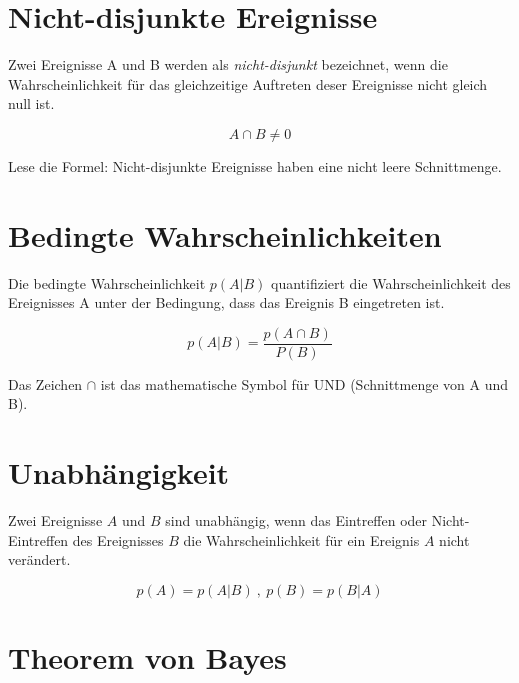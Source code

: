 \documentclass[
]{book}
\begin{document}
\hypertarget{nicht-disjunkte-ereignisse}{%
\section{Nicht-disjunkte Ereignisse}\label{nicht-disjunkte-ereignisse}}

Zwei Ereignisse A und B werden als \emph{nicht-disjunkt} bezeichnet, wenn die Wahrscheinlichkeit für das gleichzeitige Auftreten deser Ereignisse nicht gleich null ist.

\begin{equation}
  A \cap B \neq 0
  \label{eq:disjoint}
\end{equation}

Lese die Formel: Nicht-disjunkte Ereignisse haben eine nicht leere Schnittmenge.

\hypertarget{bedingte-wahrscheinlichkeiten}{%
\section{Bedingte Wahrscheinlichkeiten}\label{bedingte-wahrscheinlichkeiten}}

Die bedingte Wahrscheinlichkeit \(p(A|B)\) quantifiziert die Wahrscheinlichkeit des Ereignisses A unter der Bedingung, dass das Ereignis B eingetreten ist.

\begin{equation}
  p(A|B) = \frac{p(A \cap B)}{P(B)}
  \label{eq:condprob}
\end{equation}

Das Zeichen \(\cap\) ist das mathematische Symbol für UND (Schnittmenge von A und B).

\hypertarget{unabhuxe4ngigkeit}{%
\section{Unabhängigkeit}\label{unabhuxe4ngigkeit}}

Zwei Ereignisse \(A\) und \(B\) sind unabhängig, wenn das Eintreffen oder Nicht-Eintreffen des Ereignisses \(B\) die Wahrscheinlichkeit für ein Ereignis \(A\) nicht verändert.

\begin{equation}
  p(A) = p(A|B) ~, ~p(B) = p(B|A)
  \label{eq:independency}
\end{equation}

\hypertarget{theorem-von-bayes}{%
\section{Theorem von Bayes}\label{theorem-von-bayes}}
\end{document}
